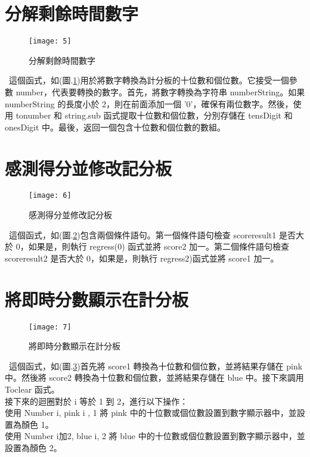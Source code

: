 \section{分解剩餘時間數字}
\begin{figure}[htbp!]
\begin{center}
\texttt{[image: 5]}
\caption{\Large 分解剩餘時間數字}\label{分解剩餘時間數字}
\end{center}
\end{figure} 
\
這個函式，如(圖.\ref{分解剩餘時間數字})用於將數字轉換為計分板的十位數和個位數。它接受一個參數 number，代表要轉換的數字。首先，將數字轉換為字符串 numberString。如果 numberString 的長度小於 2，則在前面添加一個 '0'，確保有兩位數字。然後，使用 tonumber 和 string.sub 函式提取十位數和個位數，分別存儲在 tensDigit 和 onesDigit 中。最後，返回一個包含十位數和個位數的數組。
\section{感測得分並修改記分板}
\begin{figure}[htbp!]
\begin{center}
\texttt{[image: 6]}
\caption{\Large 感測得分並修改記分板}\label{感測得分並修改記分板}
\end{center}
\end{figure} 
\
這個函式，如(圖.\ref{感測得分並修改記分板})包含兩個條件語句。第一個條件語句檢查 scoreresult1 是否大於 0，如果是，則執行 regress(0) 函式並將 score2 加一。第二個條件語句檢查 scoreresult2 是否大於 0，如果是，則執行 regress2)函式並將 score1 加一。
\newpage
\section{將即時分數顯示在計分板}
\begin{figure}[htbp!]
\begin{center}
\texttt{[image: 7]}
\caption{\Large 將即時分數顯示在計分板}\label{將即時分數顯示在計分板}
\end{center}
\end{figure} 
\
這個函式，如(圖.\ref{將即時分數顯示在計分板})首先將 score1 轉換為十位數和個位數，並將結果存儲在 pink 中。然後將 score2 轉換為十位數和個位數，並將結果存儲在 blue 中。接下來調用 Toclear 函式。\\
接下來的迴圈對於 i 等於 1 到 2，進行以下操作：\\
使用 Number i, pink i , 1 將 pink 中的十位數或個位數設置到數字顯示器中，並設置為顏色 1。\\
使用 Number i加2, blue i, 2 將 blue 中的十位數或個位數設置到數字顯示器中，並設置為顏色 2。\\
